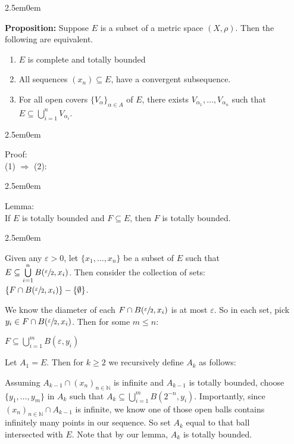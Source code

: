 \documentclass{book}
\newcommand{\hTwo}{%
\color{MidnightBlue}%
   \fontsize{13}{15}\selectfont%
}
\newcommand{\hThree}{%
   \color{PineGreen!85!Orange}
   \fontsize{12}{14}\selectfont%
}
\newcommand{\hFour}{%
   \color{Cyan!80!black}
   \fontsize{12}{14}\selectfont%
}
\newenvironment{myIndent}{%
   \begin{adjustwidth}{2.5em}{0em}%
}{%
   \end{adjustwidth}%
}
\newcommand{\blab}[1]{\textbf{#1}}
\newcommand{\retTwo}{\hfill\bigbreak}
\begin{document}
\begin{myIndent}\hTwo
   \blab{Proposition:} Suppose $E$ is a subset of a metric space $(X, \rho)$. Then the following are equivalent.
   
   \begin{enumerate}
      \item $E$ is complete and totally bounded
      \item All sequences $(x_n) \subseteq E$, have a convergent subsequence.
      \item For all open covers $\{V_\alpha\}_{\alpha \in A}$ of $E$, there exists $V_{\alpha_1}, \ldots, V_{\alpha_n}$ such that\\ $E \subseteq \bigcup\limits_{i=1}^n V_{\alpha_i}$.\retTwo
   \end{enumerate}
   
   \begin{myIndent}\hThree
      Proof:\\
      (1) $\Longrightarrow$ (2):
      \begin{myIndent}
         Lemma:\\
         If $E$ is totally bounded and $F \subseteq E$, then $F$ is totally bounded.
         \begin{myIndent}\hFour
            Given any $\varepsilon > 0$, let $\{x_1, \ldots, x_n\}$ be a subset of $E$ such that\\ $E \subseteq \bigcup\limits_{i = 1}^n B(\sfrac{\varepsilon}{2}, x_i)$. Then consider the collection of sets:\\ [-8pt] \phantom{aaaaaaaaaaaaaaaaaaaaaaaaaaaaaaa} $\{F \cap B(\sfrac{\varepsilon}{2}, x_i)\} - \{\emptyset\}$.\retTwo

            We know the diameter of each $F \cap B(\sfrac{\varepsilon}{2}, x_i)$ is at most $\varepsilon$. So in each set, pick $y_i \in F \cap B(\sfrac{\varepsilon}{2}, x_i)$. Then for some $m \leq n$:

            {\centering $F \subseteq \bigcup\limits_{i=1}^m B(\varepsilon, y_i)$ \retTwo\par}
         \end{myIndent}

         Let $A_1 = E$. Then for $k \geq 2$ we recursively define $A_k$ as follows:\retTwo
         
         Assuming $A_{k-1} \cap (x_n)_{n\in \mathbb{N}}$ is infinite and $A_{k-1}$ is totally bounded, choose\\ [-2pt] $\{y_1, \ldots, y_m\}$ in $A_k$ such that $A_k \subseteq \bigcup\limits_{i = 1}^m B(2^{-n}, y_i)$. Importantly, since\\ $(x_n)_{n\in \mathbb{N}} \cap A_{k-1}$ is infinite, we know one of those open balls contains\\ [4pt] infinitely many points in our sequence. So set $A_{k}$ equal to that ball\\ [4pt] intersected with $E$. Note that by our lemma, $A_k$ is totally bounded.\newpage


\end{myIndent}
\end{myIndent}
\end{myIndent}
\end{document}
